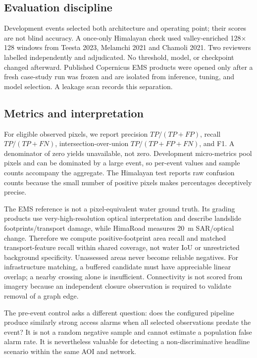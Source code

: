 \documentclass[10pt,twocolumn,letterpaper]{article}
\newcommand{\system}{HimaRoad\xspace}
\begin{document}
\subsection{Evaluation discipline}
Development events selected both architecture and operating point; their scores
are not blind accuracy. A once-only Himalayan check used valley-enriched
128$\times$128 windows from Teesta 2023, Melamchi 2021 and Chamoli 2021. Two
reviewers labelled independently and adjudicated. No threshold, model, or
checkpoint changed afterward. Published Copernicus EMS products were opened only
after a fresh case-study run was frozen and are isolated from inference, tuning,
and model selection. A leakage scan records this separation.

\subsection{Metrics and interpretation}
For eligible observed pixels, we report precision $TP/(TP+FP)$, recall
$TP/(TP+FN)$, intersection-over-union $TP/(TP+FP+FN)$, and F1. A denominator of
zero yields unavailable, not zero. Development micro-metrics pool pixels and can
be dominated by a large event, so per-event values and sample counts accompany
the aggregate. The Himalayan test reports raw confusion counts because the small
number of positive pixels makes percentages deceptively precise.

The EMS reference is not a pixel-equivalent water ground truth. Its grading
products use very-high-resolution optical interpretation and describe landslide
footprints/transport damage, while \system measures 20~m SAR/optical change.
Therefore we compute positive-footprint area recall and matched transport-feature
recall within shared coverage, not water IoU or unrestricted background
specificity. Unassessed areas never become reliable negatives. For infrastructure
matching, a buffered candidate must have appreciable linear overlap; a nearby
crossing alone is insufficient. Connectivity is not scored from imagery because
an independent closure observation is required to validate removal of a graph
edge.

The pre-event control asks a different question: does the configured pipeline
produce similarly strong access alarms when all selected observations predate the
event? It is not a random negative sample and cannot estimate a population false
alarm rate. It is nevertheless valuable for detecting a non-discriminative
headline scenario within the same AOI and network.
\end{document}
